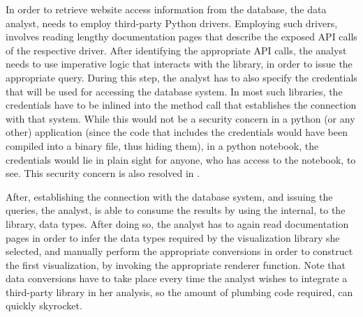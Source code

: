 In order to retrieve website access information from the database, the data analyst, needs to employ third-party Python drivers. Employing such drivers, involves reading lengthy documentation pages that describe the exposed API calls of the respective driver. After identifying the appropriate API calls, the analyst needs to use imperative logic that interacts with the library, in order to issue the appropriate query. During this step, the analyst has to also specify the credentials that will be used for accessing the database system. In most such libraries, the credentials have to be inlined into the method call that establishes the connection with that system. While this would not be a security concern in a python (or any other) application (since the code that includes the credentials would have been compiled into a binary file, thus hiding them), in a python notebook, the credentials would lie in plain sight for anyone, who has access to the notebook, to see. This security concern is also resolved in \projname. 



After, establishing the connection with the database system, and issuing the queries, the analyst, is able to consume the results by using the internal, to the library, data types. After doing so, the analyst has to again read documentation pages in order to infer the data types required by the visualization library she selected, and manually perform the appropriate conversions in order to construct the first visualization, by invoking the appropriate renderer function. Note that data conversions have to take place every time the analyst wishes to integrate a third-party library in her analysis, so the amount of plumbing code required, can quickly skyrocket.


